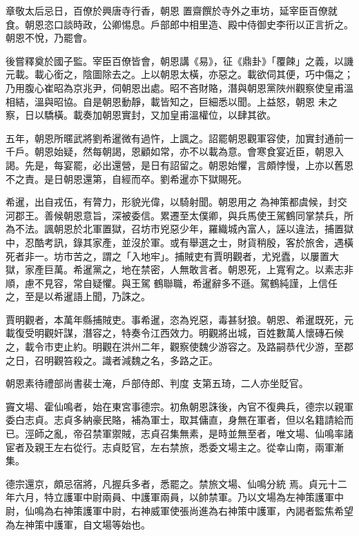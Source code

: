 \begin{pinyinscope}
 章敬太后忌日，百僚於興唐寺行香，朝恩
 置齋饌於寺外之車坊，延宰臣百僚就食。朝恩恣口談時政，公卿惕息。戶部郎中相里造、殿中侍御史李衎以正言折之。朝恩不悅，乃罷會。



 後嘗釋奠於國子監。宰臣百僚皆會，朝恩講《易》，征《鼎卦》「覆餗」之義，以譏元載。載心銜之，陰圖除去之。上以朝恩太橫，亦惡之。載欲伺其便，巧中傷之；乃用腹心崔昭為京兆尹，伺朝恩出處。昭不吝財賂，潛與朝恩黨陜州觀察使皇甫溫相結，溫與昭協。自是朝恩動靜，載皆知之，巨細悉以聞。上益怒，朝恩
 未之察，日以驕橫。載奏加朝恩實封，又加皇甫溫權位，以肆其欲。



 五年，朝恩所暱武將劉希暹微有過忤，上諷之。詔罷朝恩觀軍容使，加實封通前一千戶。朝恩始疑，然每朝謁，恩顧如常，亦不以載為意。會寒食宴近臣，朝恩入謁。先是，每宴罷，必出還營，是日有詔留之。朝恩始懼，言頗悖慢，上亦以舊恩不之責。是日朝恩還第，自經而卒。劉希暹亦下獄賜死。



 希暹，出自戎伍，有膂力，形貌光偉，以騎射聞。朝恩用之
 為神策都虞候，封交河郡王。善候朝恩意旨，深被委信。累遷至太僕卿，與兵馬使王駕鶴同掌禁兵，所為不法。諷朝恩於北軍置獄，召坊市兇惡少年，羅織城內富人，誣以違法，捕置獄中，忍酷考訊，錄其家產，並沒於軍。或有舉選之士，財貨稍殷，客於旅舍，遇橫死者非一。坊市苦之，謂之「入地牢」。捕賊吏有賈明觀者，尤兇蠹，以屢置大獄，家產巨萬。希暹黨之，地在禁密，人無敢言者。朝恩死，上寬宥之。以素志非順，慮不見容，常自疑懼。與王駕
 鶴聯職，希暹辭多不遜。駕鶴純謹，上信任之，至是以希暹語上聞，乃誅之。



 賈明觀者，本萬年縣捕賊吏。事希暹，恣為兇惡，毒甚豺狼。朝恩、希暹既死，元載復受明觀奸謀，潛容之，特奏令江西效力。明觀將出城，百姓數萬人懷磚石候之，載令市吏止約。明觀在洪州二年，觀察使魏少游容之。及路嗣恭代少游，至郡之日，召明觀笞殺之。識者減魏之名，多路之正。



 朝恩素待禮部尚書裴士淹，戶部侍郎、判度
 支第五琦，二人亦坐貶官。



 竇文場、霍仙鳴者，始在東宮事德宗。初魚朝恩誅後，內官不復典兵，德宗以親軍委白志貞。志貞多納豪民賂，補為軍士，取其傭直，身無在軍者，但以名籍請給而已。涇師之亂，帝召禁軍禦賊，志貞召集無素，是時並無至者，唯文場、仙鳴率諸宦者及親王左右從行。志貞貶官，左右禁旅，悉委文場主之。從幸山南，兩軍漸集。



 德宗還京，頗忌宿將，凡握兵多者，悉罷之。禁旅文場、仙鳴分統
 焉。貞元十二年六月，特立護軍中尉兩員、中護軍兩員，以帥禁軍。乃以文場為左神策護軍中尉，仙鳴為右神策護軍中尉，右神威軍使張尚進為右神策中護軍，內謁者監焦希望為左神策中護軍，自文場等始也。




\end{pinyinscope}
